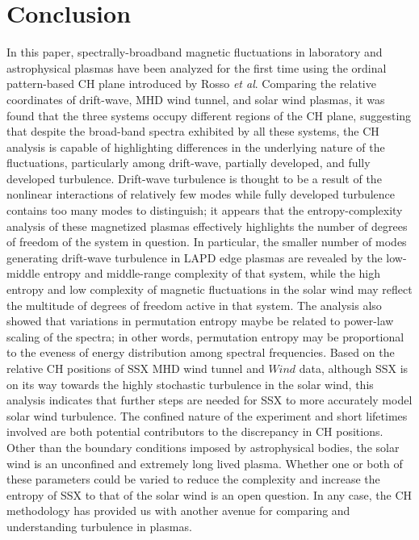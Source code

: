 \documentclass[aps,prx,twocolumn,secnumarabic,nobalancelastpage,amsmath,amssymb,
nofootinbib]{revtex4-1}
\begin{document}
\section{Conclusion}
In this paper, spectrally-broadband magnetic fluctuations in laboratory and astrophysical plasmas have been analyzed for the first time using the ordinal pattern-based CH plane introduced by Rosso \textit{et al}. Comparing the relative coordinates of drift-wave, MHD wind tunnel, and solar wind plasmas, it was found that the three systems occupy different regions of the CH plane, suggesting that despite the broad-band spectra exhibited by all these systems, the CH analysis is capable of highlighting differences in the underlying nature of the fluctuations, particularly among drift-wave, partially developed, and fully developed turbulence. Drift-wave turbulence is thought to be a result of the nonlinear interactions of relatively few modes while fully developed turbulence contains too many modes to distinguish; it appears that the entropy-complexity analysis of these magnetized plasmas effectively highlights the number of degrees of freedom of the system in question. In particular, the smaller number of modes generating drift-wave turbulence in LAPD edge plasmas are revealed by the low-middle entropy and middle-range complexity of that system, while the high entropy and low complexity of magnetic fluctuations in the solar wind may reflect the multitude of degrees of freedom active in that system. The analysis also showed that variations in permutation entropy maybe be related to power-law scaling of the spectra; in other words, permutation entropy may be proportional to the eveness of energy distribution among spectral frequencies. Based on the relative CH positions of SSX MHD wind tunnel and $\textit{Wind}$ data, although SSX is on its way towards the highly stochastic turbulence in the solar wind, this analysis indicates that further steps are needed for SSX  to more accurately model solar wind turbulence. The confined nature of the experiment and short lifetimes involved are both potential contributors to the discrepancy in CH positions. Other than the boundary conditions imposed by astrophysical bodies, the solar wind is an unconfined and extremely long lived plasma. Whether one or both of these parameters could be varied to reduce the complexity and increase the entropy of SSX to that of the solar wind is an open question. In any case, the CH methodology has provided us with another avenue for comparing and understanding turbulence in plasmas.
\end{document}

